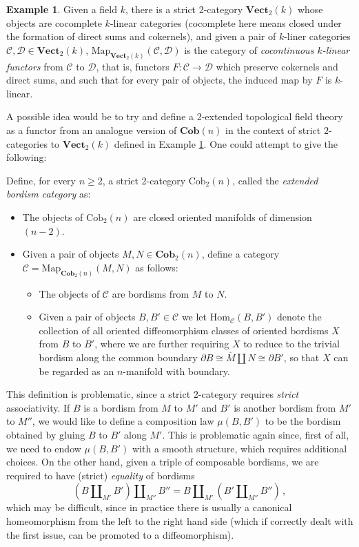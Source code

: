 \documentclass[a4paper,11pt]{article}
\newcommand{\Hom}{\mathrm{Hom}}
\newcommand{\ccal}{\mathcal{C}}
\newcommand{\dcal}{\mathcal{D}}
\newcommand{\vecto}{\mathbf{Vect}}
\theoremstyle{plain}
\theoremstyle{definition}
\newtheorem{ej}[thm]{Example}
\theoremstyle{remark}
\begin{document}
\begin{ej}
\label{2_category_vect}
Given a field $k$, there is a strict 2-category $\vecto_2(k)$ whose objects are cocomplete $k$-linear categories (cocomplete here means closed under the formation of direct sums and cokernels), and given a pair of $k$-liner categories $\ccal, \dcal \in \vecto_2(k)$, $\text{Map}_{\textbf{Vect}_2(k)}(\ccal, \dcal)$ is the category of \textit{cocontinuous $k$-linear functors} from $\ccal$ to $\dcal$, that is, functors $F \colon \ccal \to \dcal$ which preserve cokernels and direct sums, and such that for every pair of objects, the induced map by $F$ is $k$-linear. 
\end{ej}

A possible idea would be to try and define a 2-extended topological field theory as a functor from an analogue version of $\textbf{Cob}(n)$ in the context of strict $2$-categories to $\vecto_2(k)$ defined in Example \ref{2_category_vect}. One could attempt to give the following:

Define, for every $n \geq 2$, a strict 2-category $\text{Cob}_2(n)$, called the \textit{extended bordism category} as:
\begin{itemize}
    \item The objects of $\text{Cob}_2(n)$ are closed oriented manifolds of dimension $(n-2)$. 
    \item Given a pair of objects $M, N \in \textbf{Cob}_2(n)$, define a category $\ccal = \text{Map}_{\textbf{Cob}_2(n)}(M,N)$ as follows:
    \begin{itemize}
        \item The objects of $\ccal$ are bordisms from $M$ to $N$.
        \item Given a pair of objects $B, B' \in \ccal$ we let $\Hom_{\ccal}(B,B')$ denote the collection of all oriented diffeomorphism classes of oriented bordisms $X$ from $B$ to $B'$, where we are further requiring $X$ to reduce to the trivial bordism along the common boundary $\partial B \cong \overline{M} \amalg N \cong \partial B'$, so that $X$ can be regarded as an $n$-manifold with boundary.
    \end{itemize}
\end{itemize}


This definition is problematic, since a strict 2-category requires \textit{strict} associativity. If $B$ is a bordism from $M$ to $M'$ and $B'$ is another bordism from $M'$ to $M''$, we would like to define a composition law $\mu(B,B')$ to be the bordism obtained by gluing $B$ to $B'$ along $M'$. This is problematic again since, first of all, we need to endow $\mu(B,B')$ with a smooth structure, which requires additional choices. On the other hand, given a triple of composable bordisms, we are required to have (strict) \textit{equality} of bordisms 
$$(B \amalg_{M'} B') \amalg_{M''} B'' = B \amalg_{M'} (B' \amalg_{M''} B'') \, ,$$
which may be difficult, since in practice there is usually a canonical homeomorphism from the left to the right hand side (which if correctly dealt with the first issue, can be promoted to a diffeomorphism). 
\end{document}
